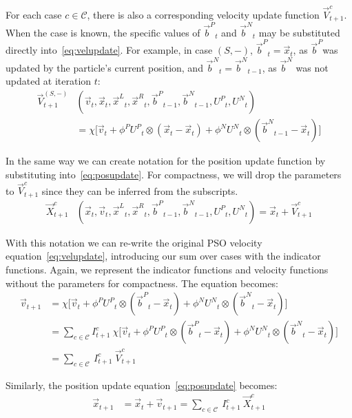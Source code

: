 \documentclass[smallcondensed]{svjour3}
\providecommand{\pers}{\ensuremath{P}}
\providecommand{\neigh}{\ensuremath{N}}
\providecommand{\leftind}{\ensuremath{L}}
\providecommand{\rightind}{\ensuremath{R}}
\providecommand{\nURand}{\ensuremath{U^\neigh}}
\providecommand{\pURand}{\ensuremath{U^\pers}}
\providecommand{\ppos}{\ensuremath{\Vec{x}}}
\providecommand{\pvel}{\ensuremath{\Vec{v}}}
\providecommand{\nbest}{\ensuremath{\Vec{b}^\neigh}}
\providecommand{\pbest}{\ensuremath{\Vec{b}^\pers}}
\providecommand{\constriction}{\ensuremath{\chi}}
\providecommand{\ncoeff}{\ensuremath{\phi^\neigh}}
\providecommand{\pcoeff}{\ensuremath{\phi^\pers}}
\providecommand{\indic}{\ensuremath{I}}
\providecommand{\specvel}{\ensuremath{\vec{V}}}
\providecommand{\specpos}{\ensuremath{\vec{X}}}
\providecommand{\leftn}{\ensuremath{\Vec{x}^\leftind}}
\providecommand{\rightn}{\ensuremath{\Vec{x}^\rightind}}
\providecommand{\caseset}{\ensuremath{\mathcal{C}}}
\providecommand{\casegen}{\ensuremath{c}}
\providecommand{\casexn}{\ensuremath{(S,-)}}
\begin{document}
For each case $\casegen \in \caseset$, there is also a corresponding
velocity update function $\specvel_{t+1}^{\casegen}$.  When the case is
known, the specific values of $\pbest_t$ and $\nbest_t$ may be substituted
directly into~\eqref{eq:velupdate}.  For example, in case $\casexn$,
$\pbest_{t}=\ppos_{t}$, as \pbest was updated by the particle's current
position, and $\nbest_{t}=\nbest_{t-1}$, as $\nbest$ was not updated at
iteration $t$:
\begin{align}
\nonumber
	\specvel_{t+1}^{\casexn} & (\pvel_t, \ppos_{t}, \leftn_{t}, \rightn_{t},
	\pbest_{t-1}, \nbest_{t-1}, \pURand_{t}, \nURand_{t}) \\
\label{eq:defvcasexn}
		&= \constriction \bigl[ \pvel_{t} +
			\pcoeff\pURand_{t}\otimes(\ppos_{t} - \ppos_{t})
			+ \ncoeff\nURand_{t}\otimes(\nbest_{t-1} -
			\ppos_{t}) \bigr]
\end{align}

In the same way we can create notation for the position update function by
substituting into~\eqref{eq:posupdate}.  For compactness, we will drop the
parameters to $\specvel_{t+1}^{\casegen}$ since they can be inferred from the
subscripts.
\begin{align}
\label{eq:defpcasegen}
	\specpos_{t+1}^{\casegen} & (\ppos_{t}, \pvel_{t}, \leftn_{t},
	\rightn_{t} ,\pbest_{t-1} ,\nbest_{t-1}, \pURand_{t}, \nURand_{t})
	= \ppos_{t} + \specvel_{t+1}^{\casegen}
\end{align}

With this notation we can re-write the original PSO velocity
equation~\eqref{eq:velupdate}, introducing our sum over cases with the
indicator functions.  Again, we represent the indicator functions and velocity
functions without the parameters for compactness.  The equation becomes:
\begin{align}
\nonumber
	\pvel_{t+1} &=
		\constriction \bigl[ \pvel_t
			+ \pcoeff\pURand_{t}\otimes(\pbest_{t} - \ppos_{t})
			+ \ncoeff\nURand_{t}\otimes(\nbest_{t} -
			\ppos_{t}) \bigr] \\
\nonumber
	&= \sum_{c \in \caseset} \indic_{t+1}^{c} \ \constriction \bigl[ \pvel_t
			+ \pcoeff\pURand_{t}\otimes(\pbest_{t} - \ppos_{t})
			+ \ncoeff\nURand_{t}\otimes(\nbest_{t} -
			\ppos_{t}) \bigr]  \\
\label{eq:vel2update}
	&= \sum_{c \in \caseset} \ \indic_{t+1}^{c} \ \specvel_{t+1}^{c}
\end{align}

Similarly, the position update equation~\eqref{eq:posupdate} becomes:
\begin{align}
\label{eq:pos2update}
	\ppos_{t+1} &= \ppos_{t} + \pvel_{t+1}
	= \sum_{c \in \caseset} \ \indic_{t+1}^{c} \ \specpos_{t+1}^{c} 
\end{align}
\end{document}

